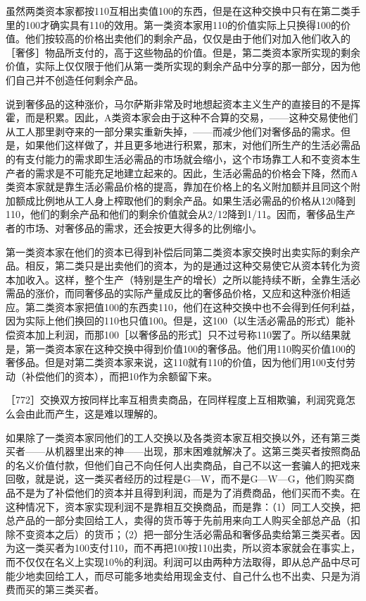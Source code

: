 虽然两类资本家都按110互相出卖值100的东西，但是在这种交换中只有在第二类手里的100才确实具有110的效用。第一类资本家用110的价值实际上只换得100的价值。他们按较高的价格出卖他们的剩余产品，仅仅是由于他们对加入他们收入的［奢侈］物品所支付的，高于这些物品的价值。但是，第二类资本家所实现的剩余价值，实际上仅仅限于他们从第一类所实现的剩余产品中分享的那一部分，因为他们自己并不创造任何剩余产品。

说到奢侈品的这种涨价，马尔萨斯非常及时地想起资本主义生产的直接目的不是挥霍，而是积累。因此，A类资本家会由于这种不合算的交易，——这种交易使他们从工人那里剥夺来的一部分果实重新失掉，——而减少他们对奢侈品的需求。但是，如果他们这样做了，并且更多地进行积累，那末，对他们所生产的生活必需品的有支付能力的需求即生活必需品的市场就会缩小，这个市场靠工人和不变资本生产者的需求是不可能充足地建立起来的。因此，生活必需品的价格会下降，然而A类资本家就是靠生活必需品价格的提高，靠加在价格上的名义附加额并且同这个附加额成比例地从工人身上榨取他们的剩余产品。如果生活必需品的价格从120降到110，他们的剩余产品和他们的剩余价值就会从2/12降到1/11。因而，奢侈品生产者的市场、对奢侈品的需求，还会按更大得多的比例缩小。

第一类资本家在他们的资本已得到补偿后同第二类资本家交换时出卖实际的剩余产品。相反，第二类只是出卖他们的资本，为的是通过这种交易使它从资本转化为资本加收入。这样，整个生产（特别是生产的增长）之所以能持续不断，全靠生活必需品的涨价，而同奢侈品的实际产量成反比的奢侈品价格，又应和这种涨价相适应。第二类资本家把值100的东西卖110，他们在这种交换中也不会得到任何利益，因为实际上他们换回的110也只值100。但是，这100（以生活必需品的形式）能补偿资本加上利润，而那100［以奢侈品的形式］只不过号称110罢了。所以结果就是，第一类资本家在这种交换中得到价值100的奢侈品。他们用110购买价值100的奢侈品。但是对第二类资本家来说，这110就有110的价值，因为他们用100支付劳动（补偿他们的资本），而把10作为余额留下来。

［772］交换双方按同样比率互相贵卖商品，在同样程度上互相欺骗，利润究竟怎么会由此而产生，这是难以理解的。

如果除了一类资本家同他们的工人交换以及各类资本家互相交换以外，还有第三类买者——从机器里出来的神——出现，那末困难就解决了。这第三类买者按照商品的名义价值付款，但他们自己不向任何人出卖商品，自己不以这一套骗人的把戏来回敬，就是说，这一类买者经历的过程是G—W，而不是G—W—G，他们购买商品不是为了补偿他们的资本并且得到利润，而是为了消费商品，他们买而不卖。在这种情况下，资本家实现利润不是靠相互交换商品，而是靠：（1）同工人交换，把总产品的一部分卖回给工人，卖得的货币等于先前用来向工人购买全部总产品（扣除不变资本之后）的货币；（2）把一部分生活必需品和奢侈品卖给第三类买者。因为这一类买者为100支付110，而不再把100按110出卖，所以资本家就会在事实上，而不仅仅在名义上实现10％的利润。利润可以由两种方法取得，即从总产品中尽可能少地卖回给工人，而尽可能多地卖给用现金支付、自己什么也不出卖、只是为消费而买的第三类买者。

